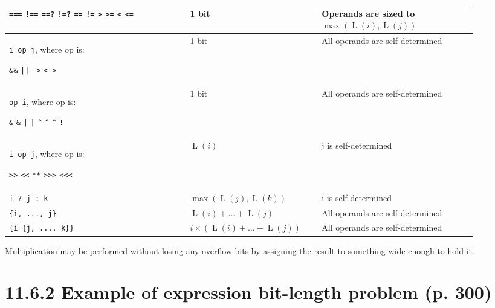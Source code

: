 \documentclass{article}
\DeclareMathOperator{\Size}{L}
\newcommand{\tild}{\raisebox{-.7ex}{\textasciitilde{}}}
\newcommand{\shiftOp}{\texttt{>{}>} \texttt{<}\texttt{<} \texttt{**}
\texttt{>{}>{}>} \texttt{<}\texttt{<}\texttt{<}}
\newcommand{\compOp}{\texttt{===} \texttt{!==} \texttt{==?} \texttt{!=?}
  \texttt{==} \texttt{!=} \texttt{>} \texttt{>=} \texttt{<} \texttt{<=}}
\newcommand{\logicOp}{\texttt{\&\&} \texttt{||} \texttt{->} \texttt{<->}}
\newcommand{\redOp}{\texttt{\&} \texttt{\tild\&} \texttt{|} \texttt{\tild|}
\texttt{\^{}} \texttt{\tild\^{}} \texttt{\^{}\tild} \texttt{!}}
\begin{document}
{\begin{center}
\begin{longtable}{|p{0.35\linewidth}|C{0.25\linewidth}|C{0.3\linewidth}|}
        \compOp{}
         & 1 bit
         & Operands are sized to $\max\left(\Size(i), \Size(j)\right)$ \\
        \hline
        \verb|i op j|, where op is:

        \logicOp{}
         & 1 bit
         & All operands are self-determined
        \\
        \hline
        \verb|op i|, where op is:

        \redOp{}
         & 1 bit
         & All operands are self-determined
        \\
        \hline
        \verb|i op j|, where op is:

        \shiftOp{}
         & $\Size(i)$
         & j is self-determined
        \\
        \hline
        \verb|i ? j : k|
         & $\max\left(\Size(j), \Size(k)\right)$
         & i is self-determined
        \\
        \hline
        \verb|{i, ..., j}|
         & $\Size(i) + \dots + \Size(j)$
         & All operands are self-determined
        \\
        \hline
        \verb|{i {j, ..., k}}|
         & $i\times\left(\Size(i) + \dots + \Size(j)\right)$
         & All operands are self-determined
        \\
        \hline
      \end{longtable}
    \end{center}

    Multiplication may be performed without losing any overflow bits by assigning
    the result to something wide enough to hold it.
  }

\section*{11.6.2 Example of expression bit-length problem (p. 300)}

\textelp{}
\end{document}

